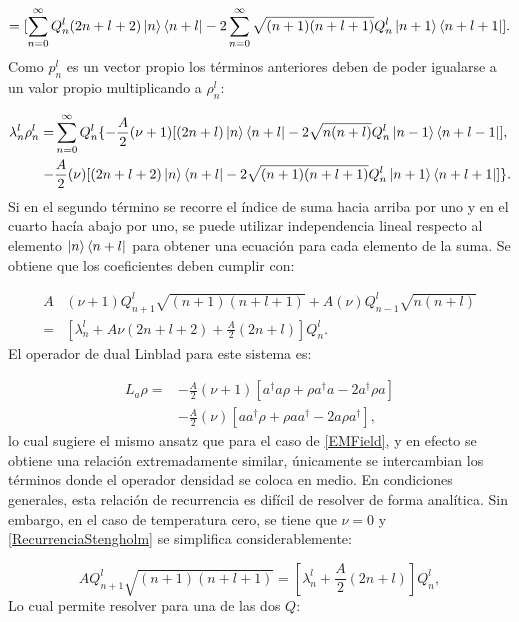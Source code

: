 \documentclass[a4paper,10pt]{report}
\begin{document}
\begin{equation}
=[\sum_{n=0}^\infty Q_n^l(2n+l+2)\Ket{n}\Bra{n+l} -2\sum_{n=0}^\infty\sqrt{(n+1)(n+l+1)} Q_n^l\Ket{n+1}\Bra{n+l+1}].
\end{equation} Como $p^l_n$  es un vector propio los términos anteriores deben de poder igualarse a un valor propio multiplicando a $\rho^l_n$:

\begin{align}
\lambda_n^l \rho_n^l=& \sum_{n=0}^\infty Q_n^l \{ -\frac{A}{2}(\nu+1)[(2n+l)\Ket{n}\Bra{n+l} -2\sqrt{n(n+l)} Q_n^l\Ket{n-1}\Bra{n+l-1}] \nonumber, \\
-&\frac{A}{2}(\nu)[(2n+l+2)\Ket{n}\Bra{n+l}-2\sqrt{(n+1)(n+l+1)} Q_n^l\Ket{n+1}\Bra{n+l+1}]\}.
\end{align} Si en el segundo término se recorre el índice de suma hacia arriba por uno y en el cuarto hacía abajo por uno, se puede utilizar independencia lineal respecto al elemento $\Ket{n}\Bra{n+l}$ para obtener una ecuación para cada elemento de la suma. Se obtiene que los coeficientes deben cumplir con:

\begin{align}\label{RecurrenciaStengholm}
A&(\nu+1) Q_{n+1}^l \sqrt{(n+1)(n+l+1) }+ A(\nu) Q_{n-1}^l\sqrt{n(n+l)}\\ \nonumber
=&[\lambda_n^l+A\nu(2n+l+2)+\frac{A}{2}(2n+l)]Q_{n}^l.
\end{align} El operador de dual Linblad para este sistema es:

\begin{align}
L_a \rho =& - \frac{A}{2}(\nu + 1)[a^\dagger a\rho + \rho a^\dagger a -2a^\dagger\rho a] \nonumber \\
 &- \frac{A}{2}(\nu)[ aa^\dagger\rho + \rho  aa^\dagger -2a\rho a^\dagger],
\end{align} lo cual sugiere el mismo ansatz que para el caso de \ref{EMField}, y en efecto se obtiene una relación extremadamente similar, únicamente se intercambian los términos donde el operador densidad se coloca en medio. En condiciones generales, esta relación de recurrencia es difícil de resolver de forma analítica. Sin embargo, en el caso de temperatura cero, se tiene que $\nu = 0$ y \ref{RecurrenciaStengholm} se simplifica considerablemente:

\begin{equation}
AQ_{n+1}^l\sqrt{(n+1)(n+l+1)}=[\lambda_n^l + \frac{A}{2}(2n+l)]Q_n^l,
\end{equation} Lo cual permite resolver para una de las dos $Q$:
\end{document}
